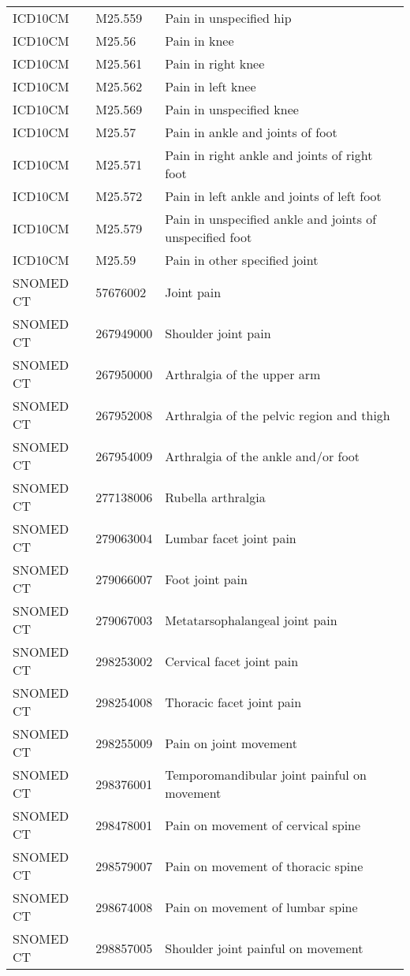 \begin{longtable}{p{}p{}p{}}
  ICD10CM & M25.559 & Pain in unspecified hip \\ 
  ICD10CM & M25.56 & Pain in knee \\ 
  ICD10CM & M25.561 & Pain in right knee \\ 
  ICD10CM & M25.562 & Pain in left knee \\ 
  ICD10CM & M25.569 & Pain in unspecified knee \\ 
  ICD10CM & M25.57 & Pain in ankle and joints of foot \\ 
  ICD10CM & M25.571 & Pain in right ankle and joints of right foot \\ 
  ICD10CM & M25.572 & Pain in left ankle and joints of left foot \\ 
  ICD10CM & M25.579 & Pain in unspecified ankle and joints of unspecified foot \\ 
  ICD10CM & M25.59 & Pain in other specified joint \\ 
  SNOMED CT & 57676002 & Joint pain \\ 
  SNOMED CT & 267949000 & Shoulder joint pain \\ 
  SNOMED CT & 267950000 & Arthralgia of the upper arm \\ 
  SNOMED CT & 267952008 & Arthralgia of the pelvic region and thigh \\ 
  SNOMED CT & 267954009 & Arthralgia of the ankle and/or foot \\ 
  SNOMED CT & 277138006 & Rubella arthralgia \\ 
  SNOMED CT & 279063004 & Lumbar facet joint pain \\ 
  SNOMED CT & 279066007 & Foot joint pain \\ 
  SNOMED CT & 279067003 & Metatarsophalangeal joint pain \\ 
  SNOMED CT & 298253002 & Cervical facet joint pain \\ 
  SNOMED CT & 298254008 & Thoracic facet joint pain \\ 
  SNOMED CT & 298255009 & Pain on joint movement \\ 
  SNOMED CT & 298376001 & Temporomandibular joint painful on movement \\ 
  SNOMED CT & 298478001 & Pain on movement of cervical spine \\ 
  SNOMED CT & 298579007 & Pain on movement of thoracic spine \\ 
  SNOMED CT & 298674008 & Pain on movement of lumbar spine \\ 
  SNOMED CT & 298857005 & Shoulder joint painful on movement \\ 

\end{longtable}
